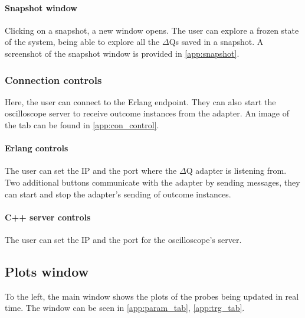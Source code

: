     \paragraph{Snapshot window}
        Clicking on a snapshot, a new window opens. The user can explore a frozen state of the system, being able to explore all the $\Delta$Qs saved in a snapshot. A screenshot of the snapshot window is provided in \cref{app:snapshot}.
   \subsubsection{Connection controls}
    
        Here, the user can connect to the Erlang endpoint. They can also start the oscilloscope server to receive outcome instances from the adapter. An image of the tab can be found in \cref{app:con_control}.

        \paragraph{Erlang controls}
            The user can set the IP and the port where the $\Delta$Q adapter is listening from. Two additional buttons communicate with the adapter by sending messages, they can start and stop the adapter's sending of outcome instances.
        
        \paragraph{C++ server controls}
            The user can set the IP and the port for the oscilloscope's server.

\subsection{Plots window}
        To the left, the main window shows the plots of the probes being updated in real time. The window can be seen in \cref{app:param_tab}, \cref{app:trg_tab}.
